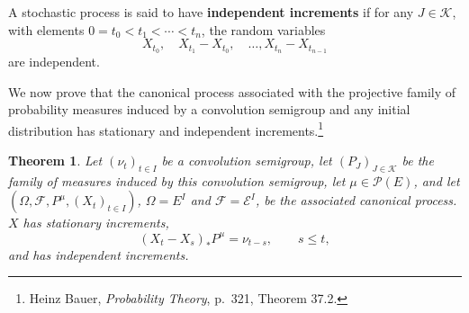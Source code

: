 \documentclass{article}
\newtheorem{theorem}{Theorem}
\theoremstyle{definition}
\begin{document}
A stochastic process is said to have \textbf{independent increments} if for
any $J \in \mathscr{K}$, with elements $0=t_0<t_1<\cdots<t_n$,
the random variables
\[
X_{t_0}, \quad X_{t_1}-X_{t_0}, \quad \ldots, X_{t_n} - X_{t_{n-1}}
\]
are independent. 

We now prove that the canonical process associated with the projective family of probability measures induced
by a convolution semigroup and any initial distribution has stationary and independent increments.\footnote{Heinz Bauer,
{\em Probability Theory}, p.~321, Theorem 37.2.}

\begin{theorem}
Let $(\nu_t)_{t \in I}$ be a convolution semigroup,
let $(P_J)_{J \in \mathscr{K}}$ be the family of measures induced by this convolution semigroup,
let $\mu \in \mathscr{P}(E)$, and let
$(\Omega,\mathscr{F},P^\mu,(X_t)_{t \in I})$,
$\Omega=E^I$ and $\mathscr{F}=\mathscr{E}^I$,
 be the associated canonical process. 
 $X$ has stationary increments,
 \begin{equation}
 (X_t-X_s)_*P^\mu = \nu_{t-s}, \qquad s \leq t,
 \label{377}
 \end{equation}
 and has independent increments.
 \label{increments}
\end{theorem}
\end{document}
